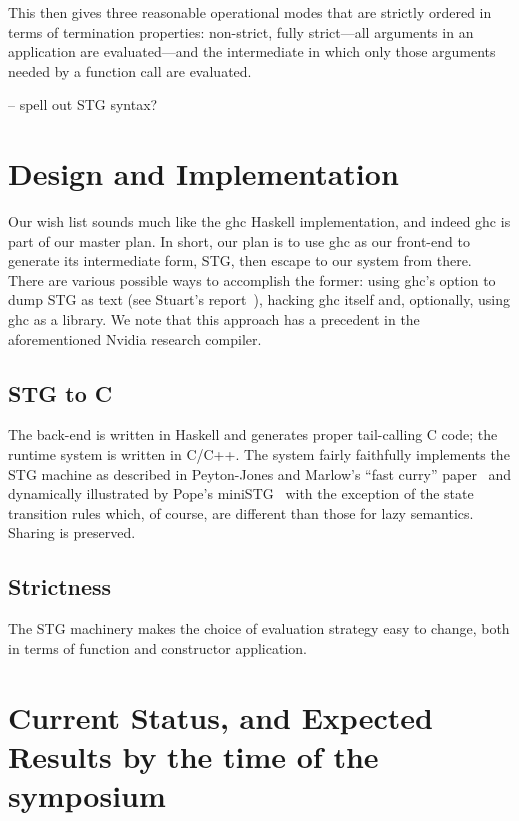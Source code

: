 \documentclass{llncs}
\begin{document}
This then gives three reasonable operational modes that are strictly ordered
in terms of termination properties: non-strict, fully strict---all arguments
in an application are evaluated---and the intermediate in which only those
arguments needed by a function call are evaluated.



-- spell out STG syntax?

\section{Design and Implementation}

Our wish list sounds much like the ghc Haskell implementation, and indeed ghc
is part of our master plan.  In short, our plan is to use ghc as our front-end
to generate its intermediate form, STG, then escape to our system from there.
There are various possible ways to accomplish the former: using ghc's option
to dump STG as text (see Stuart's report~\cite{Stuart}), hacking ghc itself
and, optionally, using ghc as a library.  We note that this approach has 
a precedent in the aforementioned Nvidia research compiler.

\subsection{STG to C}

The back-end is written in Haskell and generates proper tail-calling C code;
the runtime system is written in C/C++.  The system fairly faithfully
implements the STG machine as described in Peyton-Jones and Marlow's ``fast
curry'' paper~\cite{fastcurry} and dynamically illustrated by Pope's
miniSTG~\cite{ministg} with the exception of the state transition rules which,
of course, are different than those for lazy semantics.  Sharing is preserved.

\subsection{Strictness}

The STG machinery makes the choice of evaluation strategy easy to change, both
in terms of function and constructor application.


\section{Current Status, and Expected Results by the time of the symposium}
\end{document}

